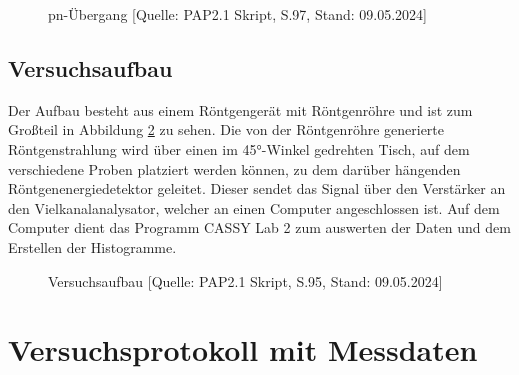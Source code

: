 \documentclass{article}
\begin{document}
\begin{figure}[!h]
    \centering
    \caption{pn-Übergang [Quelle: PAP2.1 Skript, S.97, Stand: 09.05.2024]}
    \label{fig:pn-übergang}
\end{figure}

\clearpage
\newpage

\subsection{Versuchsaufbau}

Der Aufbau besteht aus einem Röntgengerät mit Röntgenröhre und ist zum Großteil in Abbildung \ref{fig:aufbau} zu sehen. Die von der Röntgenröhre generierte Röntgenstrahlung wird über einen im 45°-Winkel gedrehten Tisch, auf dem verschiedene Proben platziert werden können, zu dem darüber hängenden Röntgenenergiedetektor geleitet. Dieser sendet das Signal über den Verstärker an den Vielkanalanalysator, welcher an einen Computer angeschlossen ist. Auf dem Computer dient das Programm CASSY Lab 2 zum auswerten der Daten und dem Erstellen der Histogramme. 

\phantom{.}

\begin{figure}[!h]
    \centering
    \caption{Versuchsaufbau [Quelle: PAP2.1 Skript, S.95, Stand: 09.05.2024]}
    \label{fig:aufbau}
\end{figure}


\newpage

\section{Versuchsprotokoll mit Messdaten}
\end{document}
